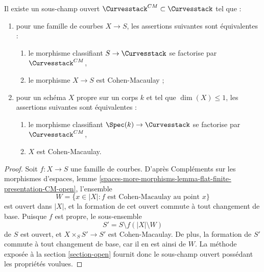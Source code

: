 \begin{lemma}
\label{lemma-CM-curves}
Il existe un sous-champ ouvert $\Curvesstack^{CM} \subset \Curvesstack$
tel que :
\begin{enumerate}
\item pour une famille de courbes $X \to S$, les assertions suivantes
sont équivalentes :
\begin{enumerate}
\item le morphisme classifiant $S \to \Curvesstack$ se factorise par
$\Curvesstack^{CM}$,
\item le morphisme $X \to S$ est Cohen-Macaulay ;
\end{enumerate}
\item pour un schéma $X$ propre sur un corps $k$ et tel que $\dim(X) \leq 1$,
les assertions suivantes sont équivalentes :
\begin{enumerate}
\item le morphisme classifiant $\Spec(k) \to \Curvesstack$ se factorise
par $\Curvesstack^{CM}$,
\item $X$ est Cohen-Macaulay.
\end{enumerate}
\end{enumerate}
\end{lemma}

\begin{proof}
Soit $f : X \to S$ une famille de courbes. D'après
Compléments sur les morphismes d'espaces, lemme
\ref{spaces-more-morphisms-lemma-flat-finite-presentation-CM-open},
l'ensemble
$$
W = \{x \in |X| : f \text{ est Cohen-Macaulay au point }x\}
$$
est ouvert dans $|X|$, et la formation de cet ouvert commute à tout
changement de base. Puisque $f$ est propre, le sous-ensemble
$$
S' = S \setminus f(|X| \setminus W)
$$
de $S$ est ouvert, et $X \times_S S' \to S'$ est Cohen-Macaulay.
De plus, la formation de $S'$ commute à tout changement de base,
car il en est ainsi de $W$. La méthode exposée à la section
\ref{section-open} fournit donc le sous-champ ouvert possédant les
propriétés voulues.
\end{proof}

